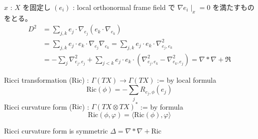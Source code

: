\begin{Proof}
\itemprof
  \(x\) : \(X\) を固定し \((e_i)\) : local orthonormal frame field で \(\nabla e_i \mid_x = 0\) を満たすものをとる。
  \begin{align*}
    D^2
    &= \sum_{j,k} e_j \cdot \nabla_{e_j} (e_k \cdot \nabla_{e_k}) \\
    &= \sum_{j,k} e_j \cdot e_k \cdot \nabla_{e_j} \nabla_{e_k} = \sum_{j,k} e_j \cdot e_k \cdot \nabla_{e_j , e_k}^2 \\
    &= -\sum_j \nabla_{e_j , e_j}^2 + \sum_{j < k} e_j \cdot e_k \cdot (\nabla_{e_j , e_k}^2 - \nabla_{e_k , e_j}^2) = \nabla * \nabla + \mathfrak{R}
  \end{align*}
\end{Proof}

\begin{Definition}
\itemdefi
  \Define Ricci transformation (\(\text{Ric}\)) : \(\Gamma(TX) \to \Gamma(TX)\) := by local formula
  \[\text{Ric}(\phi) = - \sum_j R_{e_j , \phi}(e_j)\]
  \Define Ricci curvature form (\(\text{Ric}\)) : \(\Gamma(TX \otimes TX)^*\) := by formula
  \[\text{Ric}(\phi , \varphi) = \langle \text{Ric}(\phi) , \varphi \rangle\]
\end{Definition}

\begin{Theorem}
\itemprop
  Ricci curvature form is symmetric
\itemprop
  \(\Delta = \nabla * \nabla + \text{Ric}\)
\end{Theorem}

